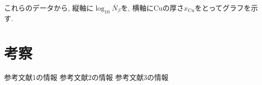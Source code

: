 \documentclass{jarticle}
\begin{document}
これらのデータから, 縦軸に$\log_{10}\overline{N}_\beta$を, 横軸に$\mathrm{Cu}$の厚さ$x_\mathrm{Cu}$をとってグラフを示す.


\section{考察}





\begin{thebibliography}{99}

   参考文献1の情報
   参考文献2の情報
   参考文献3の情報

\end{thebibliography}
\end{document}
